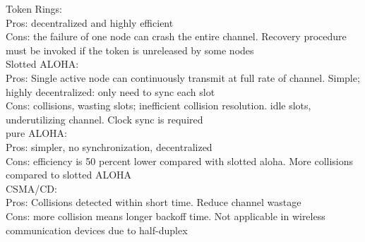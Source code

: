 \documentclass[12pt]{article}
\begin{document}
\noindent Token Rings:\\
Pros: decentralized and highly efficient\\
Cons: the failure of one node can crash the entire channel. Recovery procedure must be invoked if the token is unreleased by some nodes\\

\noindent Slotted ALOHA:\\
Pros: Single active node can continuously transmit at full rate of channel. Simple; highly decentralized: only need to sync each slot\\
Cons: collisions, wasting slots; inefficient collision resolution. idle slots, underutilizing channel. Clock sync is required\\

\noindent pure ALOHA:\\
Pros: simpler, no synchronization, decentralized\\
Cons: efficiency is 50 percent lower compared with slotted aloha. More collisions compared to slotted ALOHA\\

\noindent CSMA/CD:\\
Pros: Collisions detected within short time. Reduce channel wastage\\
Cons: more collision means longer backoff time. Not applicable in wireless communication devices due to half-duplex \\\\
\end{document}
